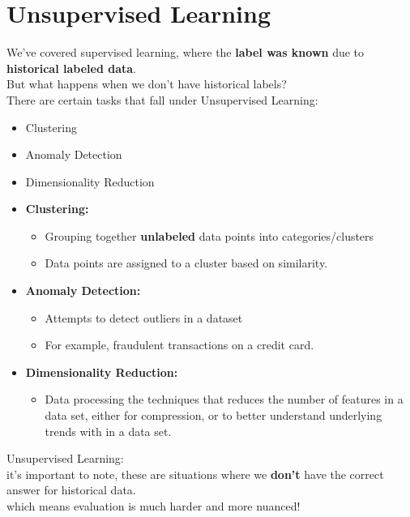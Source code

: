 \documentclass[12pt]{article}
\begin{document}
\section{Unsupervised Learning}
 
 We've covered supervised learning, where the \textbf{label was known} due to \textbf{historical labeled data}.\\
 But what happens when we don't have historical labels?\\
 There are certain tasks that fall under Unsupervised Learning:
 \begin{itemize}
 	\item
 	Clustering 
 	\item
 	Anomaly Detection
 	\item
 	Dimensionality Reduction
\end{itemize} 

 \begin{itemize}
 	\item
 	\textbf{Clustering:}
	\begin{itemize}
		\item
		 		Grouping together \textbf{unlabeled} data points into categories/clusters
		 		
		 \item
		 Data points are assigned to a cluster based on similarity.
	\end{itemize}	 
 		
 	\item
 	\textbf{Anomaly Detection:}
 	\begin{itemize}
 		\item
 		Attempts to detect outliers in a dataset
 		\item
 		For example, fraudulent transactions on a credit card.
 	\end{itemize}
 	\item
 	\textbf{Dimensionality Reduction:}
 	\begin{itemize}
 		\item
 		Data processing the techniques that reduces the number of features in a data set, either for compression, or to better understand underlying trends with in a data set.
 	\end{itemize}
\end{itemize} 

Unsupervised Learning:\\
it's important to note, these are situations where we \textbf{don't} have the correct answer for historical data.\\
\large which means evaluation is much harder and more nuanced!
\small
\end{document}

